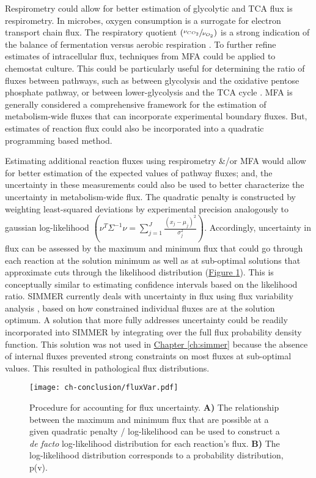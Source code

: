 Respirometry could allow for better estimation of glycolytic and TCA flux is respirometry.  In microbes, oxygen consumption is a surrogate for electron transport chain flux. The respiratory quotient $\left(\sfrac{\nu_{CO_{2}}}{\nu_{O_{2}}}\right)$ is a strong indication of the balance of fermentation versus aerobic respiration \cite{Boer:2003fi,BARFORD:1979ei}. To further refine estimates of intracellular flux, techniques from MFA could be applied to chemostat culture. This could be particularly useful for determining the ratio of fluxes between pathways, such as between glycolysis and the oxidative pentose phosphate pathway, or between lower-glycolysis and the TCA cycle \cite{Sauer:2006ii, Jazmin:2013fg, Kromer:2014wr}. MFA is generally considered a comprehensive framework for the estimation of metabolism-wide fluxes that can incorporate experimental boundary fluxes. But, estimates of reaction flux could also be incorporated into a quadratic programming based method.

Estimating additional reaction fluxes using respirometry \&/or MFA would allow for better estimation of the expected values of pathway fluxes; and, the uncertainty in these measurements could also be used to better characterize the uncertainty in metabolism-wide flux. The quadratic penalty is constructed by weighting least-squared deviations by experimental precision analogously to gaussian log-likelihood $\left(\nu^{T}\Sigma^{-1}\nu = \sum_{j = 1}^{J}\frac{\left(x_{j} - \mu_{j}\right)^2}{\sigma^{2}_j}\right)$. Accordingly, uncertainty in flux can be assessed by the maximum and minimum flux that could go through each reaction at the solution minimum as well as at sub-optimal solutions that approximate cuts through the likelihood distribution (\hyperref[conclusion-fluxUncertainty]{Figure \ref{conclusion-fluxUncertainty}}). This is conceptually similar to estimating confidence intervals based on the likelihood ratio. SIMMER currently deals with uncertainty in flux using flux variability analysis \cite{Mahadevan:2003wq}, based on how constrained individual fluxes are at the solution optimum. A solution that more fully addresses uncertainty could be readily incorporated into SIMMER by integrating over the full flux probability density function.  This solution was not used in \hyperref[ch:simmer]{Chapter \ref{ch:simmer}} because the absence of internal fluxes prevented strong constraints on most fluxes at sub-optimal values. This resulted in pathological flux distributions. 

\begin{figure}[h!]
\begin{center}
\texttt{[image: ch-conclusion/fluxVar.pdf]}
\caption[Procedure for accounting for flux uncertainty]{Procedure for accounting for flux uncertainty. \textbf{A)} The relationship between the maximum and minimum flux that are possible at a given quadratic penalty / log-likelihood can be used to construct a \textit{de facto} log-likelihood distribution for each reaction's flux. \textbf{B)} The log-likelihood distribution corresponds to a probability distribution, p(v).}
\label{conclusion-fluxUncertainty}
\end{center}
\end{figure}



